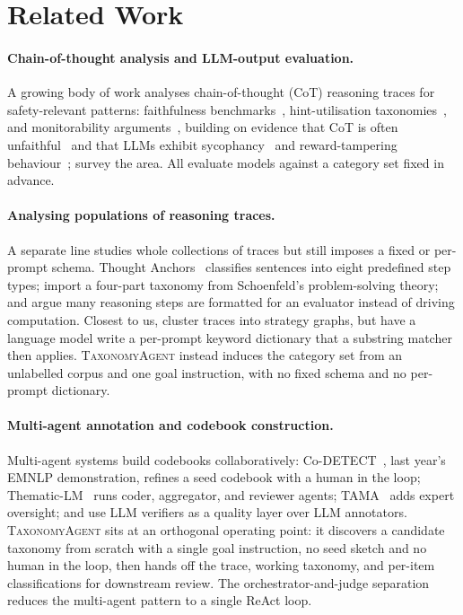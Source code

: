 \section{Related Work}
\label{sec:related}

\paragraph{Chain-of-thought analysis and LLM-output evaluation.}
A growing body of work analyses chain-of-thought (CoT) reasoning traces
for safety-relevant patterns: faithfulness
benchmarks~\citep{shen2026faithcot, song2025prmbench}, hint-utilisation
taxonomies~\citep{chen2025reasoningmodels}, and monitorability
arguments~\citep{korbak2025cotmonitor}, building on evidence that CoT is
often unfaithful~\citep{turpin2023biased, lanham2023faithfulness} and
that LLMs exhibit sycophancy~\citep{sharma2023sycophancy} and
reward-tampering behaviour~\citep{denison2024subterfuge,
perez2022discovering}; \citet{lee2025stepwiseeval} survey the area. All
evaluate models against a category set fixed in advance.

\paragraph{Analysing populations of reasoning traces.}
A separate line studies whole collections of traces but still imposes a
fixed or per-prompt schema. Thought
Anchors~\citep{bogdan2025thoughtanchors} classifies sentences into eight
predefined step types; \citet{li2026schoenfeld} import a four-part
taxonomy from Schoenfeld's problem-solving theory; and
\citet{li2026performative} argue many reasoning steps are formatted for
an evaluator instead of driving computation. Closest to us,
\citet{tyagi2026globalcot} cluster traces into strategy graphs, but have
a language model write a per-prompt keyword dictionary that a substring
matcher then applies. \textsc{TaxonomyAgent} instead induces the category
set from an unlabelled corpus and one goal instruction, with no fixed
schema and no per-prompt dictionary.

\paragraph{Multi-agent annotation and codebook construction.}
Multi-agent systems build codebooks collaboratively:
Co-DETECT~\citep{codetect2025}, last year's EMNLP demonstration, refines
a seed codebook with a human in the loop;
Thematic-LM~\citep{qiao2025thematiclm} runs coder, aggregator, and
reviewer agents; TAMA~\citep{xu2025tama} adds expert oversight; and
\citet{liu2025aiannotorch} use LLM verifiers as a quality layer over LLM
annotators. \textsc{TaxonomyAgent} sits at an orthogonal operating point:
it discovers a candidate taxonomy from scratch with a single goal
instruction, no seed sketch and no human in the loop, then hands off the
trace, working taxonomy, and per-item classifications for downstream
review. The orchestrator-and-judge separation reduces the multi-agent
pattern to a single ReAct loop.

